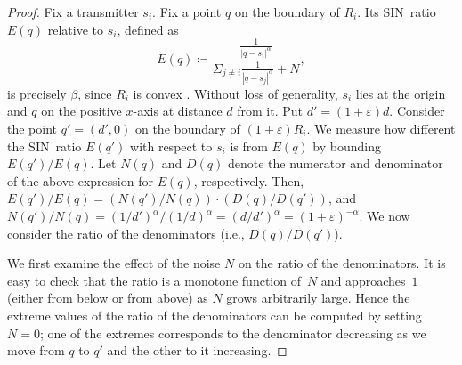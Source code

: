 \documentclass[11pt]{article}
\theoremstyle{remark}
\let\eps\varepsilon
\begin{document}
\begin{proof}
  Fix a transmitter $s_i$.  Fix a point $q$ on the boundary of $R_i$.  Its SIN~ratio $E(q)$ relative to $s_i$, defined as
  \[
    E(q)\coloneqq \frac{\frac{1}{|q-s_i|^\alpha}}{\Sigma_{j \ne
        i}{\frac{1}{|q-s_j|^\alpha}} + N},
  \]
  is precisely $\beta$, since $R_i$ is convex
  \cite{aeklpr-sdciawn-12}.  Without loss of generality, $s_i$ lies at
  the origin and $q$ on the positive $x$-axis at distance $d$ from it.
  Put $d'=(1+\eps)d$.  Consider the point $q'=(d',0)$ on the boundary
  of $(1+\eps)R_i$.  We measure how different the SIN~ratio $E(q')$ with respect to $s_i$ is
  from $E(q)$ by bounding $E(q')/E(q)$.  Let $N(q)$ and $D(q)$ denote the numerator and denominator of the above expression for $E(q)$, respectively.
  Then, $E(q')/E(q) = (N(q')/N(q)) \cdot (D(q)/D(q'))$, and
  $N(q')/N(q) = (1/d')^\alpha/(1/d)^\alpha=(d/d')^\alpha = (1+\eps)^{-\alpha}$. 
  We now consider the ratio of the denominators (i.e., $D(q)/D(q')$).

  We first examine the effect of the noise $N$ on the ratio of the denominators.  It is easy to check that the ratio is a monotone function of~$N$ and approaches~$1$ (either from below or from above) as $N$ grows arbitrarily large.  Hence the extreme values of the ratio of the denominators can be computed by setting $N=0$; one of the extremes corresponds to the denominator decreasing as we move from $q$ to $q'$ and the other to it increasing.


\end{proof}
\end{document}
